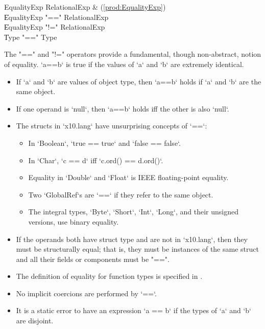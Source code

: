 \begin{bbgrammar}
 EqualityExp    \: RelationalExp & (\ref{prod:EqualityExp})\\
    \| EqualityExp \xcd"==" RelationalExp\\
    \| EqualityExp \xcd"!=" RelationalExp\\
    \| Type  \xcd"==" Type \\
\end{bbgrammar}


The \xcd"==" and \xcd"!=" operators provide a fundamental, though
non-abstract, notion of equality.  \xcd`a==b` is true if the values of \xcd`a`
and \xcd`b` are extremely identical.

\begin{itemize}
\item If \xcd`a` and \xcd`b` are values of object type, then \xcd`a==b` holds
      if \xcd`a` and \xcd`b` are the same object.
\item If one operand is \xcd`null`, then \xcd`a==b` holds iff the other is
      also \xcd`null`.
\item The structs in \xcd`x10.lang` have unsurprising concepts of \xcd`==`: 
     \begin{itemize}
     \item In \xcd`Boolean`, \xcd`true == true` and \xcd`false == false`. 
     \item In \xcd`Char`, \xcd`c == d` iff \xcd`c.ord() == d.ord()`.
     \item Equality in \xcd`Double` and \xcd`Float` is IEEE floating-point
           equality. 
     \item Two \xcd`GlobalRef`s are \xcd`==` if they refer to the same object.
     \item The integral types, \xcd`Byte`, \xcd`Short`, \xcd`Int`, \xcd`Long`,
           and their unsigned versions, use binary equality.
     \end{itemize}
\item If the operands both have struct type and are not in \xcd`x10.lang`, then they must be structurally equal;
that is, they must be instances of the same struct
and all their fields or components must be \xcd"==".   
\item The definition of equality for function types is specified in
      .
\item No implicit coercions are performed by \xcd`==`.  
\item It is a static error to have an expression \xcd`a == b` if the types of
      \xcd`a` and \xcd`b` are disjoint.  


\end{itemize}

